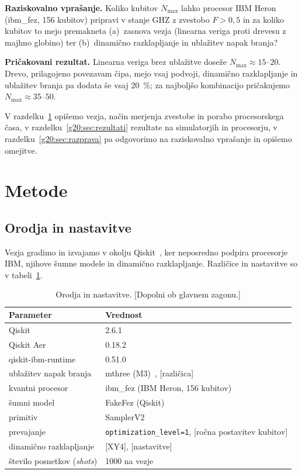 \begin{svgraybox}
\textbf{Raziskovalno vprašanje.} Koliko kubitov $N_{\max}$ lahko procesor IBM Heron (ibm\_fez, 156 kubitov) pripravi v stanje
GHZ z zvestobo $F>0{,}5$ in za koliko kubitov to mejo premakneta (a)~zasnova vezja (linearna veriga proti drevesu z majhno
globino) ter (b)~dinamično razklapljanje in ublažitev napak branja?

\textbf{Pričakovani rezultat.} Linearna veriga brez ublažitve doseže $N_{\max}\approx 15$--$20$. Drevo, prilagojeno
povezavam čipa, mejo vsaj podvoji, dinamično razklapljanje in ublažitev branja pa dodata še vsaj 20~\%; za najboljšo
kombinacijo pričakujemo $N_{\max}\approx 35$--$50$.
\end{svgraybox}

V razdelku~\ref{g20:sec:metode} opišemo vezja, način merjenja zvestobe in porabo procesorskega časa,
v razdelku~\ref{g20:sec:rezultati} rezultate na simulatorjih in procesorju, v razdelku~\ref{g20:sec:razprava} pa odgovorimo
na raziskovalno vprašanje in opišemo omejitve.


\section{Metode}
\label{g20:sec:metode}

\subsection{Orodja in nastavitve}
\label{g20:sec:orodja}

Vezja gradimo in izvajamo v okolju Qiskit~\cite{qiskit2024}, ker neposredno podpira procesorje IBM, njihove šumne modele in
dinamično razklapljanje. Različice in nastavitve so v tabeli~\ref{g20:tab:orodja}.

\begin{table}[htbp]
\caption{Orodja in nastavitve. [Dopolni ob glavnem zagonu.]}
\label{g20:tab:orodja}
\centering
\begin{tabular}{ll}
\toprule
Parameter & Vrednost \\
\midrule
Qiskit & 2.6.1 \\
Qiskit Aer & 0.18.2 \\
qiskit-ibm-runtime & 0.51.0 \\
ublažitev napak branja & mthree (M3)~\cite{g20:nation2021}, [različica] \\
kvantni procesor & ibm\_fez (IBM Heron, 156 kubitov) \\
šumni model & FakeFez (Qiskit) \\
primitiv & SamplerV2 \\
prevajanje & \texttt{optimization\_level=1}, [ročna postavitev kubitov] \\
dinamično razklapljanje & [XY4], [nastavitve] \\
število posnetkov (\emph{shots}) & 1000 na vezje \\
\bottomrule
\end{tabular}
\end{table}

